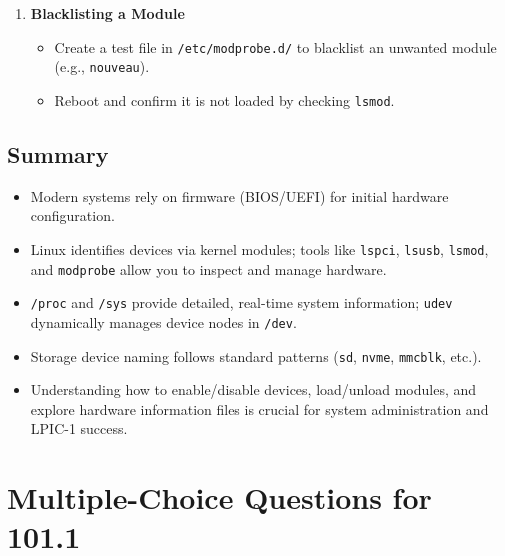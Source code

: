 \documentclass[12pt,a4paper]{report}
\begin{document}
\begin{enumerate}
    \item \textbf{Blacklisting a Module}
    \begin{itemize}
        \item Create a test file in \texttt{/etc/modprobe.d/} to blacklist an unwanted module (e.g., \texttt{nouveau}).
        \item Reboot and confirm it is not loaded by checking \texttt{lsmod}.
    \end{itemize}
\end{enumerate}

\subsection*{Summary}
\begin{itemize}
    \item Modern systems rely on firmware (BIOS/UEFI) for initial hardware configuration.
    \item Linux identifies devices via kernel modules; tools like \texttt{lspci}, \texttt{lsusb}, \texttt{lsmod}, and \texttt{modprobe} allow you to inspect and manage hardware.
    \item \texttt{/proc} and \texttt{/sys} provide detailed, real-time system information; \texttt{udev} dynamically manages device nodes in \texttt{/dev}.
    \item Storage device naming follows standard patterns (\texttt{sd}, \texttt{nvme}, \texttt{mmcblk}, etc.).
    \item Understanding how to enable/disable devices, load/unload modules, and explore hardware information files is crucial for system administration and LPIC-1 success.
\end{itemize}

\section*{Multiple-Choice Questions for 101.1}
\end{document}

